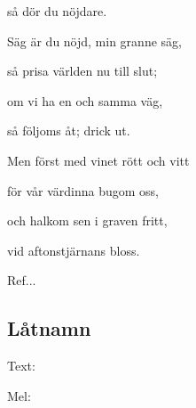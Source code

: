 så dör du nöjdare.\bigskip

Säg är du nöjd, min granne säg,

så prisa världen nu till slut;

om vi ha en och samma väg,

så följoms åt; drick ut.

Men först med vinet rött och vitt

för vår värdinna bugom oss,

och halkom sen i graven fritt,

vid aftonstjärnans bloss.\bigskip

Ref... \bigskip

\subsection{\textbf{Låtnamn}}

Text: 

Mel: \bigskip

\newpage